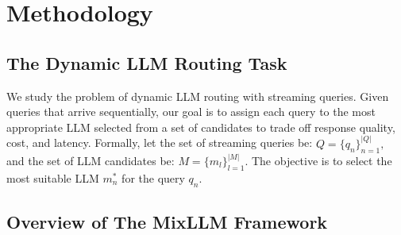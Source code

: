 

\section{Methodology}



\subsection{The Dynamic LLM Routing Task}
We study the problem of dynamic LLM routing with streaming queries. Given queries that arrive sequentially, our goal is to assign each query to the most appropriate LLM selected from a set of candidates to trade off response quality, cost, and latency.
Formally, let the set of streaming queries be:
$
    Q = \{q_n\}_{n=1}^{|Q|}, %
$
and the set of LLM candidates be:
$
    M = \{m_l\}_{l=1}^{|M|}.
$
The objective is to select the most suitable LLM $m_n^*$ for the query $q_n$.

\subsection{Overview of The MixLLM Framework}



